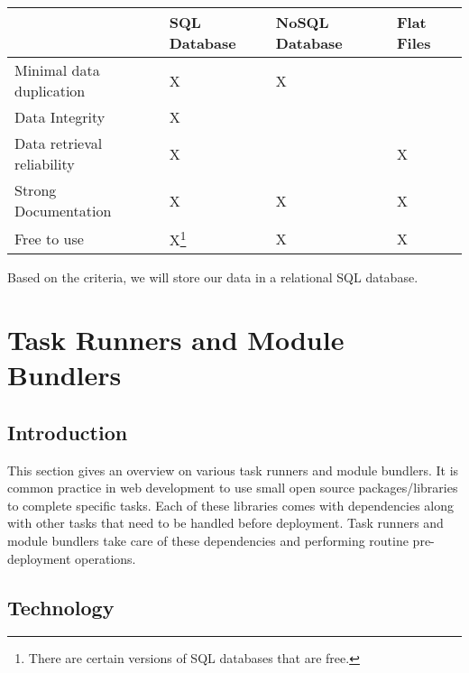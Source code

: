 \documentclass[draftclsnofoot,onecolumn,letterpaper,10pt,compsoc]{IEEEtran}
\begin{document}
		        \begin{center}
		            \begin{tabular}{| m{15em} | m{10em} | m{10em} | m{10em} |}
		                \hline
		                    & SQL Database & NoSQL Database & Flat Files \\

		                \hline
		                    Minimal data duplication & X & X & \\

		                \hline
		                    Data Integrity & X &  &  \\

		                \hline
		                    Data retrieval reliability & X &  & X \\

		                \hline
		                    Strong Documentation & X & X & X \\

		                \hline
		                    Free to use & X\footnote{There are certain versions of SQL databases that are free.} & X & X \\

		                \hline
		            \end{tabular}
		        \end{center}

		        Based on the criteria, we will store our data in a relational SQL database.

		\section{Task Runners and Module Bundlers}
		    \subsection{Introduction}
		        This section gives an overview on various task runners and module bundlers.
		        It is common practice in web development to use small open source packages/libraries to complete specific tasks.
		        Each of these libraries comes with dependencies along with other tasks that need to be handled before deployment.
		        Task runners and module bundlers take care of these dependencies and performing routine pre-deployment operations.

      \subsection{Technology}
\end{document}
